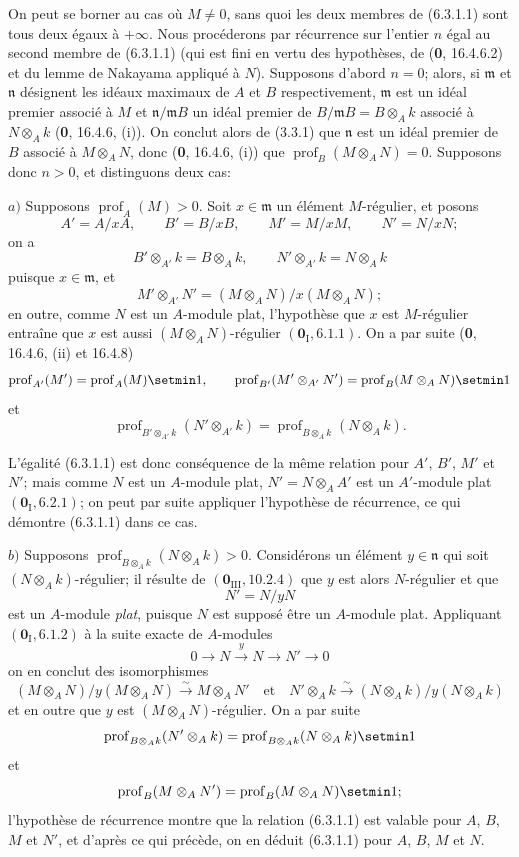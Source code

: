 On peut se borner au cas où $M\neq0$, sans quoi les deux membres de (6.3.1.1)
sont tous deux égaux à $+\infty$. Nous procéderons par récurrence sur l'entier
$n$ égal au second membre de (6.3.1.1) (qui est fini en vertu des hypothèses,
de (\textbf{0}, 16.4.6.2) et du lemme de Nakayama appliqué à $N$). Supposons d'abord
$n=0$; alors, si $\mathfrak m$ et $\mathfrak n$ désignent les idéaux maximaux
de $A$ et $B$ respectivement, $\mathfrak m$ est un idéal premier associé à $M$
et $\mathfrak n/\mathfrak mB$ un idéal premier de
$B/\mathfrak mB=B\otimes_Ak$ associé à $N\otimes_Ak$ (\textbf{0}, 16.4.6, (i)). On
conclut alors de (3.3.1) que $\mathfrak n$ est un idéal premier de $B$ associé
à $M\otimes_AN$, donc (\textbf{0}, 16.4.6, (i)) que
$\operatorname{prof}_B(M\otimes_AN)=0$. Supposons donc $n>0$, et distinguons
deux cas:

$a)$ Supposons $\operatorname{prof}_A(M)>0$. Soit $x\in\mathfrak m$ un
élément $M$-régulier, et posons
\[
A'=A/xA,\qquad B'=B/xB,\qquad M'=M/xM,\qquad N'=N/xN;
\]
on a
\[
B'\otimes_{A'}k=B\otimes_Ak,\qquad N'\otimes_{A'}k=N\otimes_Ak
\]
puisque $x\in\mathfrak m$, et
\[
M'\otimes_{A'}N'=(M\otimes_AN)/x(M\otimes_AN);
\]
en outre, comme $N$ est un $A$-module plat, l'hypothèse que $x$ est
$M$-régulier entraîne que $x$ est aussi $(M\otimes_AN)$-régulier
$(\mathbf{0}_{\mathrm I}, 6.1.1)$. On a par suite (\textbf{0}, 16.4.6, (ii) et 16.4.8)
\[
\operatorname{prof}_{A'}(M')=\operatorname{prof}_A(M)\setmin 1,
\qquad
\operatorname{prof}_{B'}(M'\otimes_{A'}N')
=\operatorname{prof}_B(M\otimes_AN)\setmin 1
\]
et
\[
\operatorname{prof}_{B'\otimes_{A'}k}(N'\otimes_{A'}k)
=\operatorname{prof}_{B\otimes_Ak}(N\otimes_Ak).
\]

L'égalité (6.3.1.1) est donc conséquence de la même relation pour $A'$,
$B'$, $M'$ et $N'$; mais comme $N$ est un $A$-module plat,
$N'=N\otimes_AA'$ est un $A'$-module plat $(\mathbf{0}_{\mathrm I}, 6.2.1)$; on peut
par suite appliquer l'hypothèse de récurrence, ce qui démontre (6.3.1.1) dans
ce cas.

$b)$ Supposons $\operatorname{prof}_{B\otimes_Ak}(N\otimes_Ak)>0$.
Considérons un élément $y\in\mathfrak n$ qui soit
$(N\otimes_Ak)$-régulier; il résulte de $(\mathbf{0}_{\mathrm{III}}, 10.2.4)$ que $y$
est alors $N$-régulier et que
\[
N'=N/yN
\]
est un $A$-module \emph{plat}, puisque $N$ est supposé être un $A$-module plat.
Appliquant $(\mathbf{0}_{\mathrm I}, 6.1.2)$ à la suite exacte de $A$-modules
\[
0\to N\xrightarrow{y}N\to N'\to0
\]
on en conclut des isomorphismes
\[
(M\otimes_AN)/y(M\otimes_AN)\xrightarrow{\sim}M\otimes_AN'
\quad\text{et}\quad
N'\otimes_Ak\xrightarrow{\sim}(N\otimes_Ak)/y(N\otimes_Ak)
\]
et en outre que $y$ est $(M\otimes_AN)$-régulier. On a par suite
\[
\operatorname{prof}_{B\otimes_Ak}(N'\otimes_Ak)
=\operatorname{prof}_{B\otimes_Ak}(N\otimes_Ak)\setmin 1
\]
et
\[
\operatorname{prof}_B(M\otimes_AN')
=\operatorname{prof}_B(M\otimes_AN)\setmin 1;
\]
l'hypothèse de récurrence montre que la relation (6.3.1.1) est valable pour
$A$, $B$, $M$ et $N'$, et d'après ce qui précède, on en déduit (6.3.1.1)
pour $A$, $B$, $M$ et $N$.

